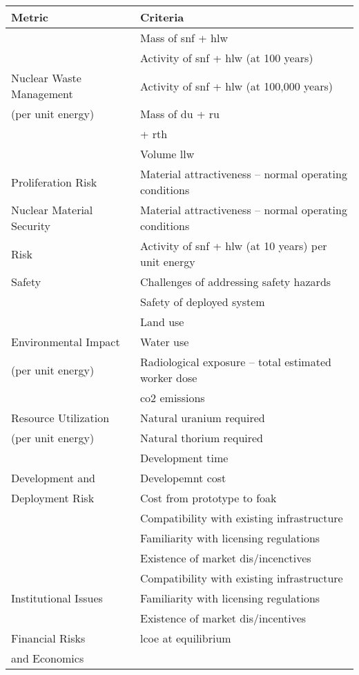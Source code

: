 \begin{tabular}{ll}
    \toprule
    Metric & Criteria \\
    \midrule
     & Mass of \gls{snf} + \gls{hlw}\\
     & Activity of \gls{snf} + \gls{hlw} (at 100 years)\\
    Nuclear Waste Management & Activity of \gls{snf} + \gls{hlw} (at 100,000 years)\\
    (per unit energy) & Mass of \gls{du} + \gls{ru}\\
     & \hspace{12em}+ \gls{rth}\\
     & Volume \gls{llw}\\
     \midrule
     Proliferation Risk & Material attractiveness -- normal operating conditions\\
     \midrule
     Nuclear Material Security & Material attractiveness -- normal operating conditions\\
    Risk & Activity of \gls{snf} + \gls{hlw} (at 10 years) per unit energy\\
    \midrule
    Safety & Challenges of addressing safety hazards\\
    & Safety of deployed system\\
    \midrule
    & Land use\\
    Environmental Impact  & Water use\\
    (per unit energy) & Radiological exposure -- total estimated worker dose\\
     & \gls{co2} emissions\\
     \midrule
     Resource Utilization & Natural uranium required\\
    (per unit energy) & Natural thorium required\\
    \midrule
    & Development time\\
    Development and & Developemnt cost\\
    Deployment Risk & Cost from prototype to \gls{foak}\\
    & Compatibility with existing infrastructure\\
    &Familiarity with licensing regulations\\
    & Existence of market dis/incenctives\\
    \midrule
      & Compatibility with existing infrastructure\\
    Institutional Issues & Familiarity with licensing regulations\\
     & Existence of market dis/incentives\\
     \midrule
    Financial Risks & \gls{lcoe} at equilibrium\\
    and Economics &\\
    \bottomrule
\end{tabular}
